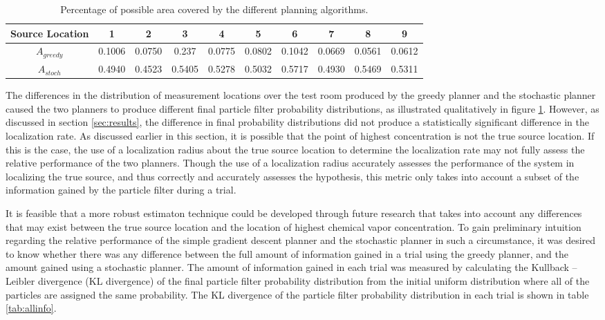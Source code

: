 \documentclass[submit, 12pt]{aiaa-pretty-modified}
\begin{document}
\begin{table}[htb]
\begin{center}
\begin{tabular}{|c||c||c||c||c||c||c||c||c||c|}
\hline
 Source Location & 1 & 2 & 3 & 4 & 5 & 6 & 7 & 8 & 9 \\
\hline \hline
$A_{greedy}$ & 0.1006 & 0.0750 & 0.237 & 0.0775 & 0.0802 & 0.1042 & 0.0669 & 0.0561 & 0.0612 \\
\hline
$A_{stoch}$ & 0.4940 & 0.4523 & 0.5405 & 0.5278 & 0.5032 & 0.5717 & 0.4930 & 0.5469 & 0.5311 \\
\hline
\end{tabular}
\caption{Percentage of possible area covered by the different planning algorithms.}
\label{tab:paths}
\end{center}
\end{table}

The differences in the distribution of measurement locations over the test room
produced by the greedy planner and the stochastic planner caused the
two planners
to produce different final particle filter probability distributions,
as illustrated qualitatively in figure \ref{tab:paths}.  However, as
discussed in section \ref{sec:results}, the difference in final
probability distributions did not produce a statistically significant
difference in the localization rate.  As discussed earlier in this
section, it is possible that the point of highest concentration is
not the true source location.  If this is the case, the use of a localization radius about
the true source location
to determine the localization rate may not fully assess the
relative performance of the two planners.  Though the use of a
localization radius accurately
assesses the performance of the system in localizing the true source,
and thus correctly and accurately assesses the hypothesis, this metric only takes
into account a subset of the information gained by the particle filter
during a trial.

It is feasible that a more robust estimaton technique could be developed through
future research that takes into account any differences that may exist
between the true source location and the location of highest chemical
vapor concentration.  To gain preliminary intuition regarding the
relative performance of the simple gradient descent planner and the
stochastic planner in such a circumstance, it was desired to know
whether there was any difference between the full amount of information
gained in a trial using the greedy planner, and the amount gained
using a stochastic planner.  The amount of information gained in each
trial was measured by calculating the Kullback – Leibler divergence (KL
divergence) of
the final particle filter probability distribution from the initial
uniform distribution where all of the particles are assigned the same
probability.  The KL divergence of the particle filter probability
distribution in each trial is shown in table \ref{tab:allinfo}.
\end{document}
